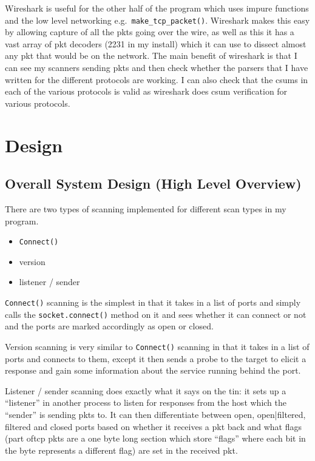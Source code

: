 \documentclass[titlepage]{article}
\let\Oldsection\section{}
\renewcommand{\section}{\FloatBarrier\Oldsection}
\let\Oldsubsection\subsection{}
\renewcommand{\subsection}{\FloatBarrier\Oldsubsection}
\begin{document}
Wireshark is useful for the other half of the program which uses impure functions and the low level 
networking e.g.\ \verb|make_tcp_packet()|. Wireshark makes this easy by allowing capture of all the 
\glspl{pkt} going over the wire, as well as this it has a vast array of \gls{pkt} decoders (2231 in 
my install) which it can use to dissect almost any \gls{pkt} that would be on the network. The main 
benefit of wireshark is that I can see my scanners sending \glspl{pkt} and then check whether the 
parsers that I have written for the different protocols are working. I can also check that the 
\glspl{csum} in each of the various protocols is valid as wireshark does \gls{csum} verification for 
various protocols. 

\section{Design}

\subsection{Overall System Design (High Level Overview)}

There are two types of scanning implemented for different scan types in my program.
\begin{itemize}
  \item{\verb|Connect()|}
  \item{version}
  \item{listener / sender}
\end{itemize}
\verb|Connect()| scanning is the simplest in that it takes in a list of \glspl{port} and simply 
calls the \verb|socket.connect()| method on it and sees whether it can connect or not and the 
\glspl{port} are marked accordingly as open or closed. 

Version scanning is very similar to \verb|Connect()| scanning in that it takes in a list of 
\glspl{port} and connects to them, except it then sends a probe to the target to elicit a response 
and gain some information about the \gls{service} running behind the \gls{port}.

Listener / sender scanning does exactly what it says on the tin: it sets up a ``listener'' in 
another process to listen for responses from the host which the ``sender'' is sending \glspl{pkt} 
to. It can then differentiate between open, open|filtered, filtered and closed \glspl{port} based on 
whether it receives a \gls{pkt} back and what flags (part of\gls{tcp} \glspl{pkt} are a one byte 
long section which store ``flags'' where each bit in the byte represents a different flag) are set 
in the received \gls{pkt}. 
\end{document}
